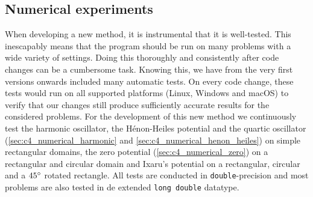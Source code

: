 






\subsection{Numerical experiments}\label{sec:c4_numerical_experiments}

When developing a new method, it is instrumental that it is well-tested. This inescapably means that the program should be run on many problems with a wide variety of settings. Doing this thoroughly and consistently after code changes can be a cumbersome task. Knowing this, we have from the very first versions onwards included many automatic tests. On every code change, these tests would run on all supported platforms (Linux, Windows and macOS) to verify that our changes still produce sufficiently accurate results for the considered problems. For the development of this new method we continuously test the harmonic oscillator, the Hénon-Heiles potential and the quartic oscillator (\ref{sec:c4_numerical_harmonic} and \ref{sec:c4_numerical_henon_heiles}) on simple rectangular domains, the zero potential (\ref{sec:c4_numerical_zero}) on a rectangular and circular domain and Ixaru's potential on a rectangular, circular and a $45\degree$ rotated rectangle. All tests are conducted in \texttt{double}-precision and most problems are also tested in de extended \texttt{long double} datatype.

